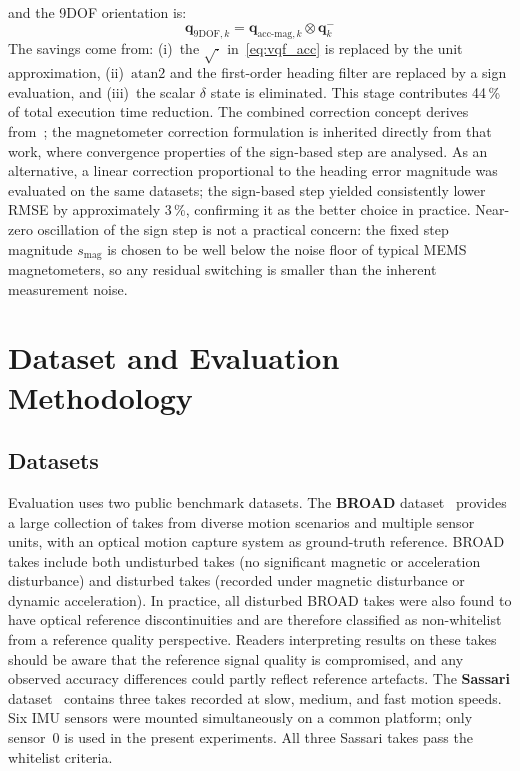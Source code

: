 \documentclass[conference]{IEEEtran}
\begin{document}
and the 9DOF orientation is:
\begin{equation}
    \mathbf{q}_{9\text{DOF},k} = \mathbf{q}_{\text{acc-mag},k} \otimes \mathbf{q}_k^-
    \label{eq:9dof}
\end{equation}
The savings come from: (i)~the $\sqrt{\cdot}$ in~\eqref{eq:vqf_acc} is replaced by the unit approximation, (ii)~$\mathrm{atan2}$ and the first-order heading filter are replaced by a sign evaluation, and (iii)~the scalar $\delta$ state is eliminated. This stage contributes 44\,\% of total execution time reduction. The combined correction concept derives from~\cite{justa2020}; the magnetometer correction formulation is inherited directly from that work, where convergence properties of the sign-based step are analysed. As an alternative, a linear correction proportional to the heading error magnitude was evaluated on the same datasets; the sign-based step yielded consistently lower RMSE by approximately 3\,\%, confirming it as the better choice in practice. Near-zero oscillation of the sign step is not a practical concern: the fixed step magnitude $s_\text{mag}$ is chosen to be well below the noise floor of typical MEMS magnetometers, so any residual switching is smaller than the inherent measurement noise.

\section{Dataset and Evaluation Methodology}

\subsection{Datasets}

Evaluation uses two public benchmark datasets. The \textbf{BROAD} dataset~\cite{laidig2021broad} provides a large 
collection of takes from diverse motion scenarios and multiple sensor units, with an optical motion 
capture system as ground-truth reference. BROAD takes include both undisturbed takes (no significant 
magnetic or acceleration disturbance) and disturbed takes (recorded under magnetic disturbance or dynamic 
acceleration). In practice, all disturbed BROAD takes were also found to have optical reference 
discontinuities and are therefore classified as non-whitelist from a reference quality perspective. Readers 
interpreting results on these takes should be aware that the reference signal quality is compromised, 
and any observed accuracy differences could partly reflect reference artefacts.
The \textbf{Sassari} dataset~\cite{caruso2021sassari} 
contains three takes recorded at slow, medium, and fast motion speeds. Six IMU sensors were mounted 
simultaneously on a common platform; only sensor~0 is used in the present experiments. All three Sassari 
takes pass the whitelist criteria.
\end{document}
